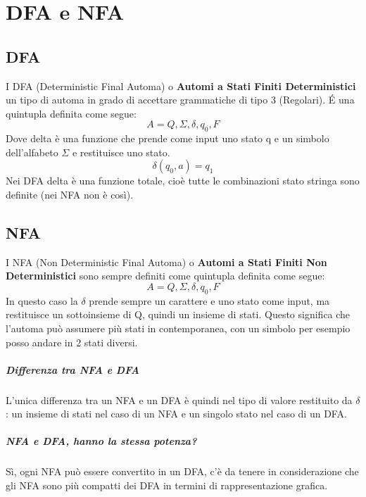 \chapter{DFA e NFA}
\section{DFA}
I DFA (Deterministic Final Automa) o \textbf{Automi a Stati Finiti Deterministici} un tipo di automa in grado
di accettare grammatiche di tipo 3 (Regolari).
\'E una quintupla definita come segue:
\begin{equation*}
    A={Q, \Sigma, \delta, q_0, F}    
\end{equation*}
Dove delta è una funzione che prende come input uno stato q e un simbolo
dell'alfabeto $\Sigma$ e restituisce uno stato.
\begin{equation*}
    \delta(q_0, a)=q_1
\end{equation*}
Nei DFA delta è una funzione totale, cioè tutte le combinazioni stato stringa sono
definite (nei NFA non è così).
\section{NFA}
I NFA (Non Deterministic Final Automa) o \textbf{Automi a Stati Finiti Non Deterministici} sono sempre definiti
come quintupla definita come segue:
\begin{equation*}
    A={Q, \Sigma, \delta, q_0, F}    
\end{equation*}
In questo caso la $\delta$ prende sempre un carattere e uno stato come input, ma
restituisce un sottoinsieme di Q, quindi un insieme di stati.
Questo significa che l'automa può assumere più stati in contemporanea, con un simbolo per
esempio posso andare in 2 stati diversi.
\paragraph*{Differenza tra NFA e DFA}L’unica
differenza tra un NFA e un DFA è quindi nel tipo di valore restituito da $\delta$: un insieme di
stati nel caso di un NFA e un singolo stato nel caso di un DFA.
\paragraph*{NFA e DFA, hanno la stessa potenza?} Sì, ogni NFA può essere convertito in un DFA, 
c'è da tenere in considerazione che gli NFA sono più compatti dei DFA in termini di rappresentazione
grafica.
